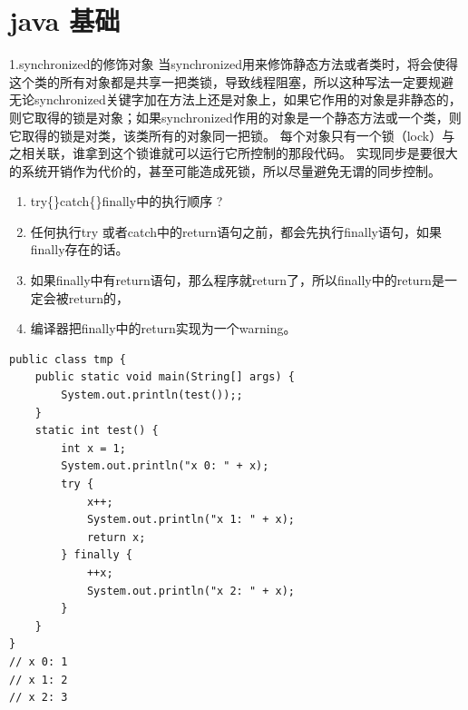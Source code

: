 \documentclass[9pt, b5paper]{article}
\begin{document}
\section{java 基础}
\label{sec-19}
1.synchronized的修饰对象
当synchronized用来修饰静态方法或者类时，将会使得这个类的所有对象都是共享一把类锁，导致线程阻塞，所以这种写法一定要规避
无论synchronized关键字加在方法上还是对象上，如果它作用的对象是非静态的，则它取得的锁是对象；如果synchronized作用的对象是一个静态方法或一个类，则它取得的锁是对类，该类所有的对象同一把锁。
每个对象只有一个锁（lock）与之相关联，谁拿到这个锁谁就可以运行它所控制的那段代码。
实现同步是要很大的系统开销作为代价的，甚至可能造成死锁，所以尽量避免无谓的同步控制。
\begin{enumerate}
\item try\{\}catch\{\}finally中的执行顺序 ?
\item 任何执行try 或者catch中的return语句之前，都会先执行finally语句，如果finally存在的话。
\item 如果finally中有return语句，那么程序就return了，所以finally中的return是一定会被return的，
\item 编译器把finally中的return实现为一个warning。
\end{enumerate}
\begin{verbatim}
public class tmp {
    public static void main(String[] args) {
        System.out.println(test());;
    }
    static int test() {
        int x = 1;
        System.out.println("x 0: " + x);
        try {
            x++;
            System.out.println("x 1: " + x);
            return x;
        } finally {
            ++x;
            System.out.println("x 2: " + x);
        }
    }
}
// x 0: 1
// x 1: 2
// x 2: 3
\end{verbatim}
\end{document}
